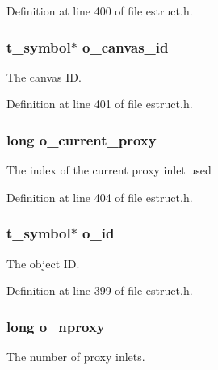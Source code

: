 Definition at line 400 of file estruct.\-h.

\hypertarget{struct__eobj_ab7f7ce6beaff87d1baca1a619b9a7ebf}{
\subsubsection[{o\-\_\-canvas\-\_\-id}]{\setlength{\rightskip}{0pt plus 5cm}t\-\_\-symbol$\ast$ o\-\_\-canvas\-\_\-id}}\label{struct__eobj_ab7f7ce6beaff87d1baca1a619b9a7ebf}
The canvas I\-D. 

Definition at line 401 of file estruct.\-h.

\hypertarget{struct__eobj_a32a8921c66d63fcccc9df035f6b9160f}{
\subsubsection[{o\-\_\-current\-\_\-proxy}]{\setlength{\rightskip}{0pt plus 5cm}long o\-\_\-current\-\_\-proxy}}\label{struct__eobj_a32a8921c66d63fcccc9df035f6b9160f}
The index of the current proxy inlet used 

Definition at line 404 of file estruct.\-h.

\hypertarget{struct__eobj_a024c5a2d6d2dcdf531f05a0e711cce68}{
\subsubsection[{o\-\_\-id}]{\setlength{\rightskip}{0pt plus 5cm}t\-\_\-symbol$\ast$ o\-\_\-id}}\label{struct__eobj_a024c5a2d6d2dcdf531f05a0e711cce68}
The object I\-D. 

Definition at line 399 of file estruct.\-h.

\hypertarget{struct__eobj_a5959b8f1e0726d2a7d82a4d39ae803bb}{
\subsubsection[{o\-\_\-nproxy}]{\setlength{\rightskip}{0pt plus 5cm}long o\-\_\-nproxy}}\label{struct__eobj_a5959b8f1e0726d2a7d82a4d39ae803bb}
The number of proxy inlets. 


